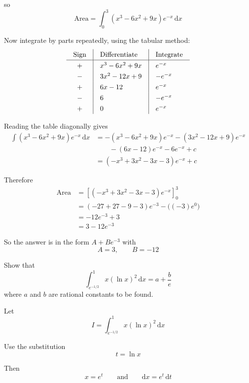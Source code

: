 \documentclass[leqno]{article}
\begin{document}
\begin{enumerate}[
  label=\textbf{\arabic*.},
  leftmargin=*,
  topsep=0pt,
  partopsep=0pt,
  parsep=0pt
]
\begin{djsSolution}
so
\[
\text{Area}=\int_0^3 (x^3-6x^2+9x)e^{-x}\, \mathrm{d}x
\]

Now integrate by parts repeatedly, using the tabular method:
\[
\renewcommand{\arraystretch}{1.3}
\setlength{\arraycolsep}{10pt}
\begin{array}{c|l|l}
\text{Sign} & \text{Differentiate} & \text{Integrate} \\ \hline
+ & x^3-6x^2+9x & e^{-x} \\
- & 3x^2-12x+9 & -e^{-x} \\
+ & 6x-12 & e^{-x} \\
- & 6 & -e^{-x} \\
+ & 0 & e^{-x} \\
\end{array}
\]

Reading the table diagonally gives
\begin{align*}
\int (x^3-6x^2+9x)e^{-x}\, \mathrm{d}x
&= -(x^3-6x^2+9x)e^{-x} -(3x^2-12x+9)e^{-x} \\
&\qquad -(6x-12)e^{-x} - 6e^{-x} + c \\
&= (-x^3+3x^2-3x-3)e^{-x}+c
\end{align*}

Therefore
\begin{align*}
\text{Area}
&=\left[(-x^3+3x^2-3x-3)e^{-x}\right]_0^3 \\
&= (-27+27-9-3)e^{-3} - \bigl((-3)e^0\bigr) \\
&= -12e^{-3}+3 \\
&= 3-12e^{-3}
\end{align*}

So the answer is in the form \(A+Be^{-3}\) with
\[
A=3,\qquad B=-12
\]
\end{djsSolution}


\newpage

\questionitem

Show that
\[
\int_{e^{-1/2}}^1 x(\ln x)^2\,\mathrm{d}x = a + \frac{b}{e}
\]
where $a$ and $b$ are rational constants to be found. 

\vspace*{10pt}

\begin{djsSolution}
Let
\[
I=\int_{e^{-1/2}}^{1} x(\ln x)^2\,\mathrm{d}x
\]

Use the substitution
\[
t=\ln x
\]

Then
\[
x=e^t
\qquad\text{and}\qquad
\mathrm{d}x=e^t\,\mathrm{d}t
\]


\end{djsSolution}
\end{enumerate}
\end{document}
